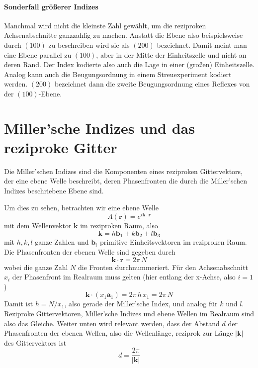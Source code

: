 \paragraph{Sonderfall größerer Indizes} Manchmal wird nicht die kleinste Zahl gewählt, um die reziproken Achsenabschnitte ganzzahlig zu machen. Anstatt die Ebene also beispielsweise durch $(100)$ zu beschreiben wird sie als $(200)$ bezeichnet. Damit meint man eine Ebene parallel zu $(100)$, aber in der Mitte der Einheitszelle und nicht an deren Rand. Der Index kodierte also auch die Lage in einer (großen) Einheitszelle. Analog kann auch die Beugungsordnung in einem Streuexperiment kodiert werden. $(200)$  bezeichnet dann die zweite Beugungsordnung eines Reflexes von der $(100)$-Ebene.


\section{Miller'sche Indizes und das reziproke Gitter}

Die Miller'schen Indizes sind die Komponenten eines reziproken Gittervektors, der eine ebene Welle beschreibt, deren Phasenfronten die durch die Miller'schen Indizes beschriebene Ebene sind.

Um dies zu sehen, betrachten wir eine ebene Welle 
\begin{equation}
 A(\mathbf{r}) = e^{i \mathbf{k} \cdot \mathbf{r}}
\end{equation}
mit dem Wellenvektor $\mathbf{k}$ im reziproken Raum, also
\begin{equation}
\mathbf{k} = h \mathbf{b}_1 + k \mathbf{b}_2  +l  \mathbf{b}_3 
\end{equation}
mit $h,k,l$ ganze Zahlen und $ \mathbf{b}_i$ primitive Einheitsvektoren im reziproken Raum. Die Phasenfronten der ebenen Welle sind gegeben durch
\begin{equation}
\mathbf{k} \cdot \mathbf{r} = 2 \pi \, N
\end{equation}
wobei die ganze Zahl $N$ die Fronten durchnummeriert. Für den Achsenabschnitt $x_i$ der Phasenfront im Realraum muss gelten (hier entlang der x-Achse, also $i=1$)
\begin{equation}
 \mathbf{k} \cdot (x_1 \mathbf{a}_1) = 2 \pi \, h \, x_1 = 2 \pi \, N
\end{equation}
Damit ist $h = N / x_1$, also gerade der Miller'sche Index, und analog für $k$ und $l$. Reziproke Gittervektoren, Miller'sche Indizes und ebene Wellen im Realraum sind also das Gleiche. Weiter unten wird relevant werden, dass der Abstand $d$  der Phasenfronten der ebenen Wellen, also die Wellenlänge, reziprok zur Länge $| \mathbf{k} |$ des Gittervektors ist
\begin{equation}
 d = \frac{2 \pi}{| \mathbf{k} |}
\end{equation}



